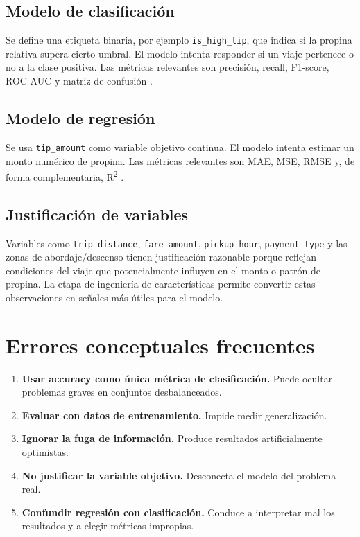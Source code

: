 \documentclass[12pt]{article}
\begin{document}
\subsection{Modelo de clasificación}
Se define una etiqueta binaria, por ejemplo \texttt{is\_high\_tip}, que indica si la propina relativa supera cierto umbral. El modelo intenta responder si un viaje pertenece o no a la clase positiva. Las métricas relevantes son precisión, recall, F1-score, ROC-AUC y matriz de confusión \cite{gcp_confusion_matrix,gcp_roc_curve,google_class_metrics}.

\subsection{Modelo de regresión}
Se usa \texttt{tip\_amount} como variable objetivo continua. El modelo intenta estimar un monto numérico de propina. Las métricas relevantes son MAE, MSE, RMSE y, de forma complementaria, R\textsuperscript{2} \cite{gcp_evaluate,google_linear_loss}.

\subsection{Justificación de variables}
Variables como \texttt{trip\_distance}, \texttt{fare\_amount}, \texttt{pickup\_hour}, \texttt{payment\_type} y las zonas de abordaje/descenso tienen justificación razonable porque reflejan condiciones del viaje que potencialmente influyen en el monto o patrón de propina. La etapa de ingeniería de características permite convertir estas observaciones en señales más útiles para el modelo.

\section{Errores conceptuales frecuentes}
\begin{enumerate}[label=\textbf{E\arabic*.}, leftmargin=*]
\item \textbf{Usar accuracy como única métrica de clasificación.} Puede ocultar problemas graves en conjuntos desbalanceados.
\item \textbf{Evaluar con datos de entrenamiento.} Impide medir generalización.
\item \textbf{Ignorar la fuga de información.} Produce resultados artificialmente optimistas.
\item \textbf{No justificar la variable objetivo.} Desconecta el modelo del problema real.
\item \textbf{Confundir regresión con clasificación.} Conduce a interpretar mal los resultados y a elegir métricas impropias.
\end{enumerate}
\end{document}
